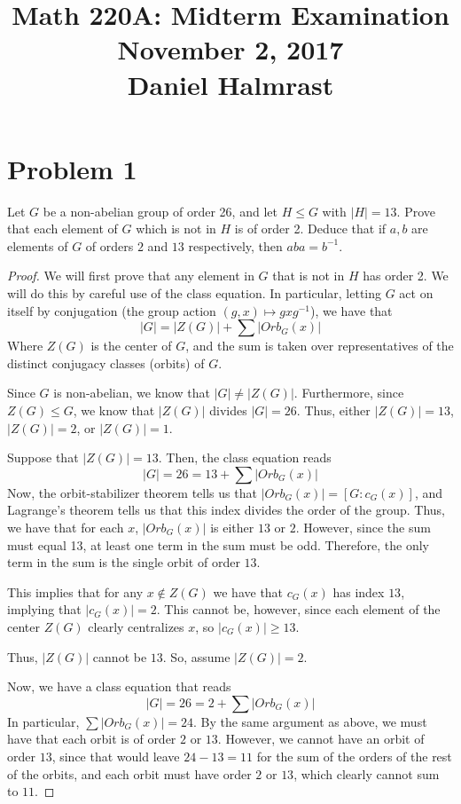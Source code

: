 \documentclass[12pt,reqno]{amsart}
\newcommand{\inv}{^{-1}}
\begin{document}
\title[]{Math 220A: Midterm Examination\\
        November 2, 2017\\
        Daniel Halmrast}
\maketitle
\large
\section*{Problem 1}
Let $G$ be a non-abelian group of order 26, and let $H\leq G$ with $|H|=13$.
Prove that each element of $G$ which is not in $H$ is of order 2. Deduce that
if $a, b$ are elements of $G$ of orders $2$ and $13$ respectively, then
$aba=b\inv$.
\\
\begin{proof}
    We will first prove that any element in $G$ that is not in $H$ has
    order 2. We will do this by careful use of the class equation. In
    particular, letting $G$ act on itself by conjugation (the group action
    $(g,x)\mapsto gxg\inv$), we have that
    \[
        |G| = |Z(G)| + \sum|Orb_G(x)|
    \]
    Where $Z(G)$ is the center of $G$, and the sum is taken over
    representatives of the distinct conjugacy classes (orbits) of $G$.
    
    Since $G$ is non-abelian, we know that $|G|\neq|Z(G)|$. Furthermore, since
    $Z(G)\leq G$, we know that $|Z(G)|$ divides $|G|=26$. Thus, either
    $|Z(G)| = 13$, $|Z(G)| = 2$, or $|Z(G)| = 1$.

    Suppose that $|Z(G)| = 13$.
    Then, the class equation reads
    \[
        |G| = 26 = 13 + \sum|Orb_G(x)|
    \]
    Now, the orbit-stabilizer theorem tells us that $|Orb_G(x)| = [G:c_G(x)]$,
    and Lagrange's theorem tells us that this index divides the order of the
    group. Thus, we have that for each $x$, $|Orb_G(x)|$ is either $13$ or $2$.
    However, since the sum must equal 13, at least one term in the sum must be
    odd. Therefore, the only term in the sum is the single orbit of order $13$.

    This implies that for any $x\not\in Z(G)$ we have that $c_G(x)$ has index
    $13$, implying that $|c_G(x)| = 2$. This cannot be, however, since each
    element of the center $Z(G)$ clearly centralizes $x$, so $|c_G(x)|\geq 13$.

    Thus, $|Z(G)|$ cannot be $13$. So, assume $|Z(G)| = 2$.

    Now, we have a class equation that reads
    \[
    |G| = 26 = 2 + \sum|Orb_G(x)|
    \]
    In particular, $\sum|Orb_G(x)| = 24$. By the same argument as above, we
    must have that each orbit is of order $2$ or $13$. However, we cannot
    have an orbit of order $13$, since that would leave $24-13=11$ for the sum
    of the orders of the rest of the orbits, and each orbit must have order $2$
    or $13$, which clearly cannot sum to $11$.


\end{proof}
\end{document}
